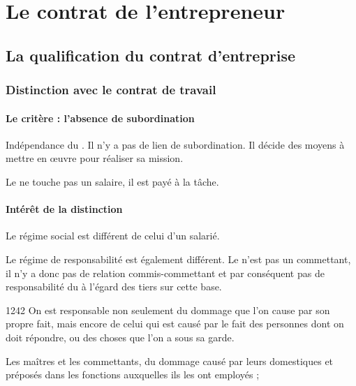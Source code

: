 \chapter{Le contrat de l'entrepreneur}

	\section{La qualification du contrat d'entreprise}
	
		\subsection{Distinction avec le contrat de travail}
		
			\subsubsection{Le critère : l'absence de subordination}
			
				Indépendance du \lo{}. Il n'y a pas de lien de subordination. Il décide des moyens à mettre en œuvre pour réaliser sa mission.
				
				Le \lo{} ne touche pas un salaire, il est payé à la tâche.
			
			\subsubsection{Intérêt de la distinction}
			
				Le régime social est différent de celui d'un salarié.
				
				Le régime de responsabilité est également différent. Le \Mo{} n'est pas un commettant, il n'y a donc pas de relation commis-commettant et par conséquent pas de responsabilité du \Mo{} à l'égard des tiers sur cette base.
				
				\begin{citationArticleCciv}{1242}
					On est responsable non seulement du dommage que l'on cause par son propre fait, mais encore de celui qui est causé par le fait des personnes dont on doit répondre, ou des choses que l'on a sous sa garde.
					
					\lips
					
					Les maîtres et les commettants, du dommage causé par leurs domestiques et préposés dans les fonctions auxquelles ils les ont employés ;
					
					\lips
				\end{citationArticleCciv}
				
